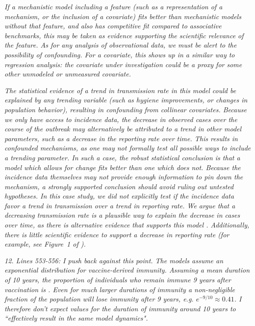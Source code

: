 \documentclass[11pt]{article}
\newcommand\report[1]{{\color{mygreen} \vspace{1mm}\hspace{0.25in}\parbox{6in}{\em #1}}}
\newcommand\article[1]{{\color{blue} \vspace{1mm}\hspace{0.25in}\parbox{6in}{\em #1}}}
\begin{document}
\article{If a mechanistic model including a feature (such as a representation of a mechanism, or the inclusion of a covariate) fits better than mechanistic models without that feature, and also has competitive fit compared to associative benchmarks, this may be taken as evidence supporting the scientific relevance of the feature.
As for any analysis of observational data, we must be alert to the possibility of confounding.
For a covariate, this shows up in a similar way to regression analysis: the covariate under investigation could be a proxy for some other unmodeled \new{phenomenon} or unmeasured covariate.}

\article{The statistical evidence of a trend in transmission rate in this model could be explained by any trending variable (such as hygiene improvements, or changes in population behavior), resulting in confounding from collinear covariates. Because we only have access to incidence data, the decrease in observed cases over the course of the outbreak may alternatively be attributed to a trend in other model parameters, such as a decrease in the reporting rate over time.
This results in confounded mechanisms, as one may not formally test all possible ways to include a trending parameter. In such a case, the robust statistical conclusion is that a model which allows for change fits better than one which does not. Because the incidence data themselves may not provide enough information to pin down the mechanism, a strongly supported conclusion should avoid ruling out untested hypotheses. In this case study, we did not explicitly test if the incidence data favor a trend in transmission over a trend in reporting rate. We argue that a decreasing transmission rate is a plausible way to explain the decrease in cases over time, as there is alternative evidence that supports this model \cite{rebaudet19CATI,rebaudet21,michel19}. Additionally, there is little scientific evidence to support a decrease in reporting rate (for example, see Figure~1 of \cite{rebaudet21}).}

\report{12.
  Lines 553-556: I push back against this point. The models assume an exponential distribution for vaccine-derived immunity. Assuming a mean duration of 10 years, the proportion of individuals who remain immune 9 years after vaccination is . Even for much larger durations of immunity a non-negligible fraction of the population will lose immunity after 9 years, e.g. $e^{-9/10}\approx 0.41$. I therefore don't expect values for the duration of immunity around 10 years to ``effectively result in the same model dynamics".
}
\end{document}

